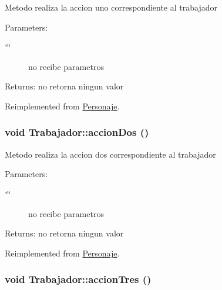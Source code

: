 Metodo realiza la accion uno correspondiente al trabajador \begin{Desc}
\item[Parameters:]
\begin{description}
\item[{\em \char`\"{}\char`\"{}}]no recibe parametros \end{description}
\end{Desc}
\begin{Desc}
\item[Returns:]no retorna ningun valor \end{Desc}


Reimplemented from \hyperlink{classPersonaje_0454b75ccc8f7e33f03e2cfb2c59e725}{Personaje}.\hypertarget{classTrabajador_598df69f74628e4da5d0dc776c98b114}{
\subsubsection[accionDos]{\setlength{\rightskip}{0pt plus 5cm}void Trabajador::accionDos ()}}
\label{classTrabajador_598df69f74628e4da5d0dc776c98b114}


Metodo realiza la accion dos correspondiente al trabajador \begin{Desc}
\item[Parameters:]
\begin{description}
\item[{\em \char`\"{}\char`\"{}}]no recibe parametros \end{description}
\end{Desc}
\begin{Desc}
\item[Returns:]no retorna ningun valor \end{Desc}


Reimplemented from \hyperlink{classPersonaje_af7763eb6099390038b7833129a1ef9f}{Personaje}.\hypertarget{classTrabajador_9203576ae93a8854b033f1d91e25fee7}{
\subsubsection[accionTres]{\setlength{\rightskip}{0pt plus 5cm}void Trabajador::accionTres ()}}
\label{classTrabajador_9203576ae93a8854b033f1d91e25fee7}



